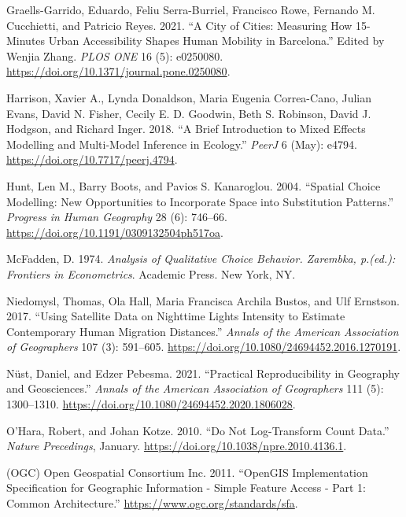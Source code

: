 \documentclass[11pt,letterpaper]{article}
\newlength{\cslhangindent}
\newlength{\cslentryspacingunit} %
\newenvironment{CSLReferences}[2] %
 {%
  \setlength{\parindent}{0pt}
  \ifodd #1
  \let\oldpar\par
  \def\par{\hangindent=\cslhangindent\oldpar}
  \fi
  \setlength{\parskip}{#2\cslentryspacingunit}
 }%
 {}
\begin{document}
\begin{CSLReferences}{1}{0}
\leavevmode{}%
Graells-Garrido, Eduardo, Feliu Serra-Burriel, Francisco Rowe, Fernando M. Cucchietti, and Patricio Reyes. 2021. {``A City of Cities: Measuring How 15-Minutes Urban Accessibility Shapes Human Mobility in Barcelona.''} Edited by Wenjia Zhang. \emph{PLOS ONE} 16 (5): e0250080. \url{https://doi.org/10.1371/journal.pone.0250080}.

\leavevmode{}%
Harrison, Xavier A., Lynda Donaldson, Maria Eugenia Correa-Cano, Julian Evans, David N. Fisher, Cecily E. D. Goodwin, Beth S. Robinson, David J. Hodgson, and Richard Inger. 2018. {``A Brief Introduction to Mixed Effects Modelling and Multi-Model Inference in Ecology.''} \emph{PeerJ} 6 (May): e4794. \url{https://doi.org/10.7717/peerj.4794}.

\leavevmode{}%
Hunt, Len M., Barry Boots, and Pavios S. Kanaroglou. 2004. {``Spatial Choice Modelling: New Opportunities to Incorporate Space into Substitution Patterns.''} \emph{Progress in Human Geography} 28 (6): 746--66. \url{https://doi.org/10.1191/0309132504ph517oa}.

\leavevmode{}%
McFadden, D. 1974. \emph{Analysis of Qualitative Choice Behavior. Zarembka, p.(ed.): Frontiers in Econometrics}. Academic Press. New York, NY.

\leavevmode{}%
Niedomysl, Thomas, Ola Hall, Maria Francisca Archila Bustos, and Ulf Ernstson. 2017. {``Using Satellite Data on Nighttime Lights Intensity to Estimate Contemporary Human Migration Distances.''} \emph{Annals of the American Association of Geographers} 107 (3): 591--605. \url{https://doi.org/10.1080/24694452.2016.1270191}.

\leavevmode{}%
Nüst, Daniel, and Edzer Pebesma. 2021. {``Practical Reproducibility in Geography and Geosciences.''} \emph{Annals of the American Association of Geographers} 111 (5): 1300--1310. \url{https://doi.org/10.1080/24694452.2020.1806028}.

\leavevmode{}%
O'Hara, Robert, and Johan Kotze. 2010. {``Do Not Log-Transform Count Data.''} \emph{Nature Precedings}, January. \url{https://doi.org/10.1038/npre.2010.4136.1}.

\leavevmode{}%
(OGC) Open Geospatial Consortium Inc. 2011. {``OpenGIS Implementation Specification for Geographic Information - Simple Feature Access - Part 1: Common Architecture.''} \url{https://www.ogc.org/standards/sfa}.


\end{CSLReferences}
\end{document}
